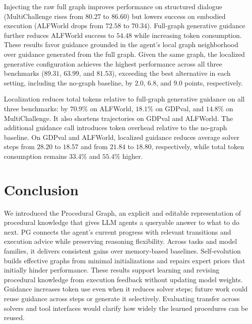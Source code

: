 Injecting the raw full graph improves performance on structured dialogue (MultiChallenge rises from $80.27$ to $86.60$) but lowers success on embodied execution (ALFWorld drops from $72.58$ to $70.34$). Full-graph generative guidance further reduces ALFWorld success to $54.48$ while increasing token consumption. These results favor guidance grounded in the agent's local graph neighborhood over guidance generated from the full graph. Given the same graph, the localized generative configuration achieves the highest performance across all three benchmarks ($89.31$, $63.99$, and $81.53$), exceeding the best alternative in each setting, including the no-graph baseline, by $2.0$, $6.8$, and $9.0$ points, respectively.

Localization reduces total tokens relative to full-graph generative guidance on all three benchmarks: by $70.9\%$ on ALFWorld, $18.1\%$ on GDPval, and $14.8\%$ on MultiChallenge. It also shortens trajectories on GDPval and ALFWorld. The additional guidance call introduces token overhead relative to the no-graph baseline. On GDPval and ALFWorld, localized guidance reduces average solver steps from $28.20$ to $18.57$ and from $21.84$ to $18.80$, respectively, while total token consumption remains $33.4\%$ and $55.4\%$ higher.

\section{Conclusion}

We introduced the Procedural Graph, an explicit and editable representation of procedural knowledge that gives LLM agents a queryable answer to what to do next. PG connects the agent's current progress with relevant transitions and execution advice while preserving reasoning flexibility. Across tasks and model families, it delivers consistent gains over memory-based baselines. Self-evolution builds effective graphs from minimal initializations and repairs expert priors that initially hinder performance. These results support learning and revising procedural knowledge from execution feedback without updating model weights. Guidance increases token use even when it reduces solver steps; future work could reuse guidance across steps or generate it selectively. Evaluating transfer across solvers and tool interfaces would clarify how widely the learned procedures can be reused.

\clearpage


\clearpage

